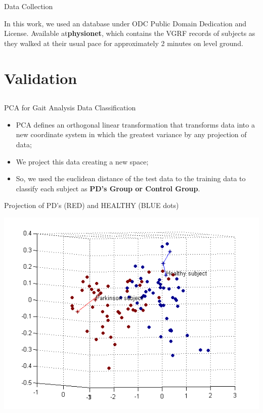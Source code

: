 \documentclass{beamer}
\begin{document}

\begin{frame}{Data Collection}
	\begin{block}
	In this work, we used an database under ODC Public Domain Dedication and License. Available at\textbf{physionet}, which contains the VGRF records of subjects as they walked at their usual pace for approximately 2 minutes on level ground. 
	\end{block}
\end{frame}

\section{Validation}
\subsection{}
\begin{frame}{PCA for Gait Analysis Data Classification}
	\begin{block}{}
		\begin{itemize}[<+->]
			\item PCA defines an orthogonal linear transformation that transforms data into a new coordinate system in which the greatest variance by any projection of data;
			\item We project this data creating a new space;
			\item So, we used the euclidean distance of the test data to the training data to classify each subject as \textbf{PD's Group or Control Group}.
		\end{itemize}
	\end{block}
\end{frame}


\begin{frame}{Projection of PD's (RED) and HEALTHY (BLUE dots)}
	\begin{block}{}
		\begin{center}
				\includegraphics[height=2.6 in]{img/pca-projection-health-parkinson.png}
		\end{center}
	\end{block}
\end{frame}
\end{document}
